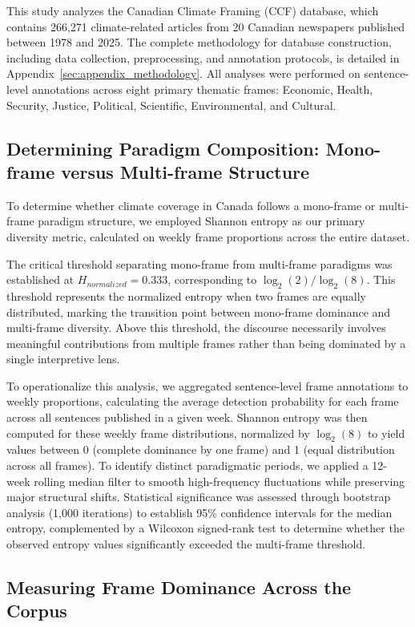 \documentclass[12pt]{article}
\begin{document}
This study analyzes the Canadian Climate Framing (CCF) database, which contains 266,271 climate-related articles from 20 Canadian newspapers published between 1978 and 2025. The complete methodology for database construction, including data collection, preprocessing, and annotation protocols, is detailed in Appendix~\ref{sec:appendix_methodology}. All analyses were performed on sentence-level annotations across eight primary thematic frames: Economic, Health, Security, Justice, Political, Scientific, Environmental, and Cultural.

\subsection{Determining Paradigm Composition: Mono-frame versus Multi-frame Structure}

To determine whether climate coverage in Canada follows a mono-frame or multi-frame paradigm structure, we employed Shannon entropy as our primary diversity metric, calculated on weekly frame proportions across the entire dataset. 

The critical threshold separating mono-frame from multi-frame paradigms was established at $H_{normalized} = 0.333$, corresponding to $\log_2(2)/\log_2(8)$. This threshold represents the normalized entropy when two frames are equally distributed, marking the transition point between mono-frame dominance and multi-frame diversity. Above this threshold, the discourse necessarily involves meaningful contributions from multiple frames rather than being dominated by a single interpretive lens.

To operationalize this analysis, we aggregated sentence-level frame annotations to weekly proportions, calculating the average detection probability for each frame across all sentences published in a given week. Shannon entropy was then computed for these weekly frame distributions, normalized by $\log_2(8)$ to yield values between 0 (complete dominance by one frame) and 1 (equal distribution across all frames). To identify distinct paradigmatic periods, we applied a 12-week rolling median filter to smooth high-frequency fluctuations while preserving major structural shifts. Statistical significance was assessed through bootstrap analysis (1,000 iterations) to establish 95\% confidence intervals for the median entropy, complemented by a Wilcoxon signed-rank test to determine whether the observed entropy values significantly exceeded the multi-frame threshold.

\subsection{Measuring Frame Dominance Across the Corpus}
\end{document}
